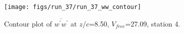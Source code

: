 \begin{figure}[H]
\centering
\texttt{[image: figs/run\_37/run\_37\_ww\_contour]}
\caption{Contour plot of $\overline{w^\prime w^\prime}$ at $z/c$=8.50, $V_{free}$=27.09, station 4.}
\label{fig:run_37_ww_contour}
\end{figure}


